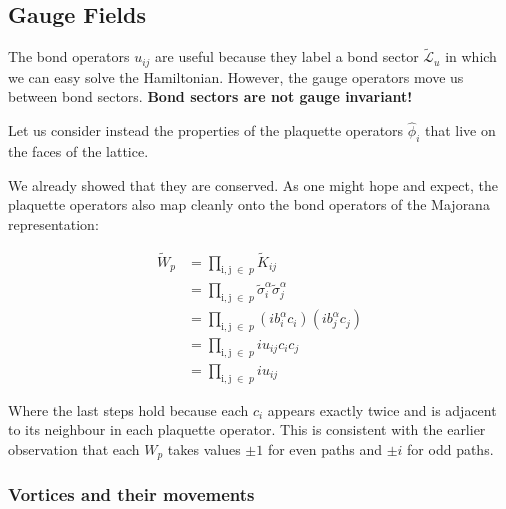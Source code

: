 \hypertarget{gauge-fields}{%
\subsection{Gauge Fields}\label{gauge-fields}}

The bond operators \(u_{ij}\) are useful because they label a bond sector \(\mathcal{\tilde{L}}_u\) in which we can easy solve the Hamiltonian. However, the gauge operators move us between bond sectors. \textbf{Bond sectors are not gauge invariant!}

Let us consider instead the properties of the plaquette operators \(\hat{\phi}_i\) that live on the faces of the lattice.

We already showed that they are conserved. As one might hope and expect, the plaquette operators also map cleanly onto the bond operators of the Majorana representation:

\[\begin{aligned}
\tilde{W}_p &= \prod_{\mathrm{i,j}\; \in\; p} \tilde{K}_{ij}\\
            &= \prod_{\mathrm{i,j}\; \in\; p} \tilde{\sigma}_i^\alpha \tilde{\sigma}_j^\alpha\\
            &= \prod_{\mathrm{i,j}\; \in\; p} (ib^\alpha_i c_i)(ib^\alpha_j c_j)\\
            &= \prod_{\mathrm{i,j}\; \in\; p} i u_{ij} c_i c_j\\
            &= \prod_{\mathrm{i,j}\; \in\; p} i u_{ij}
\end{aligned}\]

Where the last steps hold because each \(c_i\) appears exactly twice and is adjacent to its neighbour in each plaquette operator. This is consistent with the earlier observation that each \(W_p\) takes values \(\pm 1\) for even paths and \(\pm i\) for odd paths.

\hypertarget{vortices-and-their-movements}{%
\subsubsection{Vortices and their movements}\label{vortices-and-their-movements}}

